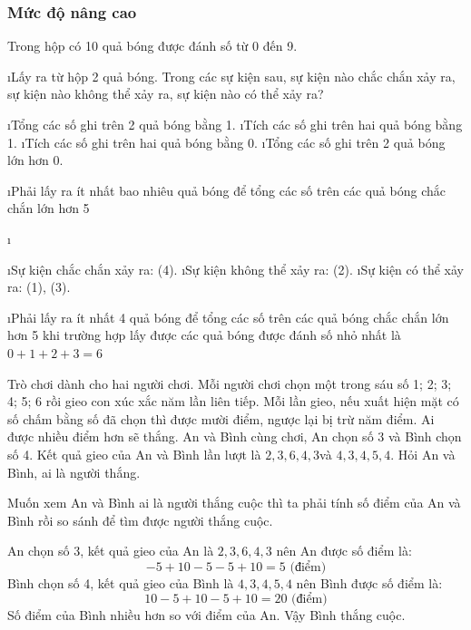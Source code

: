 \subsubsection*{Mức độ nâng cao}
\begin{bt}
	Trong hộp có 10 quả bóng được đánh số từ 0 đến 9. 
	\begin{enumerate}[a),leftmargin=*]
		\i Lấy ra từ hộp 2 quả bóng. Trong các sự kiện sau, sự kiện nào chắc chắn xảy ra, sự kiện nào không thể xảy ra, sự kiện nào có thể xảy ra?
		\begin{enumerate}[(1),leftmargin=*]
			\i Tổng các số ghi trên 2 quả bóng bằng 1.
			\i Tích các số ghi trên hai quả bóng bằng 1.
			\i Tích các số ghi trên hai quả bóng bằng 0.
			\i Tổng các số ghi trên 2 quả bóng lớn hơn 0.
		\end{enumerate}
		\i Phải lấy ra ít nhất bao nhiêu quả bóng để tổng các số trên các quả bóng chắc chắn lớn hơn 5 
	\end{enumerate}
	\begin{loigiaichuong41}
		\begin{enumerate}[a),leftmargin=*]
			\i \begin{enumerate}[--,leftmargin=*]
				\i Sự kiện chắc chắn xảy ra: (4).
				\i Sự kiện không thể xảy ra: (2).
				\i Sự kiện có thể xảy ra: (1), (3).
			\end{enumerate}
			\i Phải lấy ra ít nhất 4 quả bóng để tổng các số trên các quả bóng chắc chắn lớn hơn 5 khi trường hợp lấy được các quả bóng được đánh số nhỏ nhất là  $0 + 1 + 2 + 3 = 6$
		\end{enumerate}
	\end{loigiaichuong41}
\end{bt}
\begin{bt}
	Trò chơi dành cho hai người chơi. Mỗi người chơi chọn một trong sáu số 1; 2; 3; 4; 5; 6 rồi gieo con xúc xắc năm lần liên tiếp. Mỗi lần gieo, nếu xuất hiện mặt có số chấm bằng số đã chọn thì được mười điểm, ngược lại bị trừ năm điểm. Ai được nhiều điểm hơn sẽ thắng. An và Bình cùng chơi, An chọn số 3 và Bình chọn số 4. Kết quả gieo của An và Bình lần lượt là $2,3,6,4,3 $và $4,3,4,5,4$. Hỏi An và Bình, ai là người thắng.
	\begin{loigiaichuong41}
		Muốn xem An và Bình ai là người thắng cuộc thì ta phải tính số điểm của An và Bình rồi so sánh để tìm được người thắng cuộc.
		
		An chọn số 3, kết quả gieo của An là $2,3,6,4,3$ nên An được số điểm là:
		\[ - 5 + 10 - 5 - 5 + 10 = 5 \text{ (điểm)}\]
		Bình chọn số 4, kết quả gieo của Bình là $4,3,4,5,4$ nên Bình được số điểm là:
		\[10 - 5 + 10 - 5 + 10 = 20 \text{ (điểm)}\] 
		Số điểm của Bình nhiều hơn so với điểm của An. Vậy Bình thắng cuộc.
	\end{loigiaichuong41}
\end{bt}
